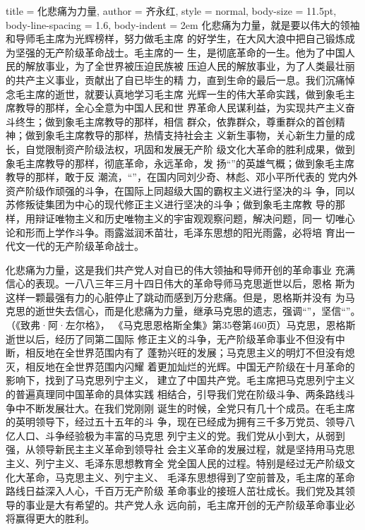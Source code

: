 \begin{hongqiarticle}{
        title  = {化悲痛为力量},
        author = {齐永红},
        style  = normal,
        body-size = 11.5pt,
        body-line-spacing = 1.6,
        body-indent = 2em
    }
    化悲痛为力量，就是要以伟大的领袖和导师毛主席为光辉榜样，努力做毛主席
    的好学生，在大风大浪中把自己锻炼成为坚强的无产阶级革命战士。毛主席的一
    生，是彻底革命的一生。他为了中国人民的解放事业，为了全世界被压迫民族被
    压迫人民的解放事业，为了人类最壮丽的共产主义事业，贡献出了自已毕生的精
    力，直到生命的最后一息。我们沉痛悼念毛主席的逝世，就要认真地学习毛主席
    光辉一生的伟大革命实践，做到象毛主席教导的那样，全心全意为中国人民和世
    界革命人民谋利益，为实现共产主义奋斗终生；做到象毛主席教导的那样，相信
    群众，依靠群众，尊重群众的首创精神；做到象毛主席教导的那样，热情支持社会主
    义新生事物，关心新生力量的成长，自觉限制资产阶级法权，巩固和发展无产阶
    级文化大革命的胜利成果，做到象毛主席教导的那样，彻底革命，永远革命，发
    扬“”的英雄气概；做到象毛主席教导的那样，敢于反
    潮流，“”，在国内同刘少奇、林彪、邓小平所代表的
    党内外资产阶级作顽强的斗争，在国际上同超级大国的霸权主义进行坚决的斗
    争，同以苏修叛徒集团为中心的现代修正主义进行坚决的斗争；做到象毛主席教
    导的那样，用辩证唯物主义和历史唯物主义的宇宙观观察问题，解决问题，同一
    切唯心论和形而上学作斗争。雨露滋润禾苗壮，毛泽东思想的阳光雨露，必将培
    育出一代文一代的无产阶级革命战士。
    
    化悲痛为力量，这是我们共产党人对自已的伟大领抽和导师开创的革命事业
    充满信心的表现。一八八三年三月十四日伟大的革命导师马克思逝世以后，恩格
    斯为这样一颗最强有力的心脏停止了跳动而感到万分悲痛。但是，恩格斯并没有
    为马克思的逝世失去信心，而是化悲痛为力量，继承马克思的遗志，强调“”，坚信“”。（《致弗·阿·左尔格》，
    《马克思恩格斯全集》第35卷第460页）马克思，恩格斯逝世以后，经历了同第二国际
    修正主义的斗争，无产阶级革命事业不但没有中断，相反地在全世界范围内有了
    蓬勃兴旺的发展；马克思主义的明灯不但没有熄灭，相反地在全世界范围内闪耀
    着更加灿烂的光辉。中国无产阶级在十月革命的影响下，找到了马克思列宁主义，
    建立了中国共产党。毛主席把马克思列宁主义的普遍真理同中国革命的具体实践
    相结合，引导我们党在阶级斗争、两条路线斗争中不断发展壮大。在我们党刚刚
    诞生的时候，全党只有几十个成员。在毛主席的英明领导下，经过五十五年的斗
    争，现在已经成为拥有三千多万党员、领导八亿人口、斗争经验极为丰富的马克思
    列宁主义的党。我们党从小到大，从弱到强，从领导新民主主义革命到领导社
    会主义革命的发展过程，就是坚持用马克思主义、列宁主义、毛泽东思想教育全
    党全国人民的过程。特别是经过无产阶级文化大革命，马克思主义、列宁主义、
    毛泽东思想得到了空前普及，毛主席的革命路线日益深入人心，千百万无产阶级
    革命事业的接班人茁壮成长。我们党及其领导的事业是大有希望的。共产党人永
    远向前，毛主席开创的无产阶级革命事业必将赢得更大的胜利。
    

\end{hongqiarticle}
